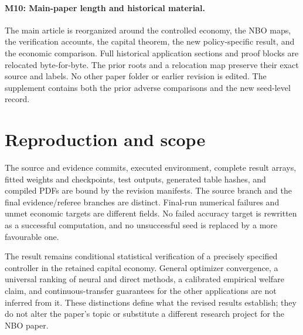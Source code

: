 \paragraph{M10: Main-paper length and historical material.}
The main article is reorganized around the controlled economy, the NBO maps, the verification accounts, the capital theorem, the new policy-specific result, and the economic comparison. Full historical application sections and proof blocks are relocated byte-for-byte. The prior roots and a relocation map preserve their exact source and labels. No other paper folder or earlier revision is edited. The supplement contains both the prior adverse comparisons and the new seed-level record.

\section*{Reproduction and scope}
The source and evidence commits, executed environment, complete result arrays, fitted weights and checkpoints, test outputs, generated table hashes, and compiled PDFs are bound by the revision manifests. The source branch and the final evidence/referee branches are distinct. Final-run numerical failures and unmet economic targets are different fields. No failed accuracy target is rewritten as a successful computation, and no unsuccessful seed is replaced by a more favourable one.

The result remains conditional statistical verification of a precisely specified controller in the retained capital economy. General optimizer convergence, a universal ranking of neural and direct methods, a calibrated empirical welfare claim, and continuous-transfer guarantees for the other applications are not inferred from it. These distinctions define what the revised results establish; they do not alter the paper's topic or substitute a different research project for the NBO paper.
